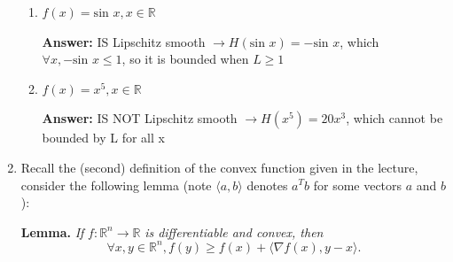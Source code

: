 \documentclass{assignment}
\newcommand{\R}{\mathbb{R}}
\begin{document}
\begin{problem}
\begin{enumerate}
\begin{enumerate}[label=(\alph*)]

        
        \item $f(x) = \text{sin } x, x \in \R$

        \color{blue}\textbf{Answer:} IS Lipschitz smooth $\rightarrow H(\text{sin } x) = -\text{sin } x$, which $\forall x, -\text{sin } x \leq 1$, so it is bounded when $L \geq 1$ \color{black}


        
        \item $f(x) = x^5, x \in \R$

        \color{blue}\textbf{Answer:} IS NOT Lipschitz smooth $\rightarrow H(x^5) = 20x^3$, which cannot be bounded by L for all x \color{black}


    \end{enumerate}

        
    \item Recall the (second) definition of the convex function given in the lecture, consider the following lemma (note $\langle a, b \rangle$ denotes $a^Tb$ for some vectors $a$ and $b$):

    \textbf{Lemma.} \textit{If} $f : \R^n \rightarrow \R$ \textit{is differentiable and convex, then}
    \begin{displaymath}
        \forall x,y \in \R^n, f(y) \geq f(x) + \langle \nabla f(x), y-x \rangle.
        \tag*{(1-1)}
    \end{displaymath}

    \begin{enumerate}[label=(\alph*)]


        

\end{enumerate}
\end{enumerate}
\end{problem}
\end{document}
